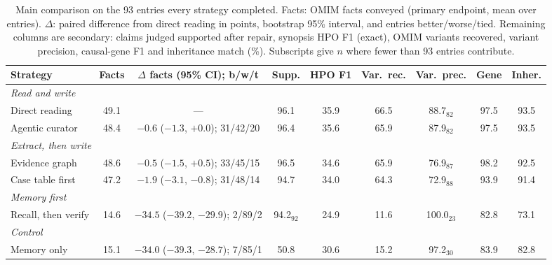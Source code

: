 \documentclass{article} %
\begin{document}
\begin{table}[t]
\caption{Main comparison on the 93 entries every strategy completed. Facts: OMIM facts conveyed (primary endpoint, mean over entries). $\Delta$: paired difference from direct reading in points, bootstrap 95\% interval, and entries better/worse/tied. Remaining columns are secondary: claims judged supported after repair, synopsis HPO F1 (exact), OMIM variants recovered, variant precision, causal-gene F1 and inheritance match (\%). Subscripts give $n$ where fewer than 93 entries contribute.}
\label{tab:main}
\begin{center}
\footnotesize
\setlength{\tabcolsep}{2.2pt}
\begin{tabular}{lcccccccc}
\toprule
Strategy & Facts & $\Delta$ facts (95\% CI); b/w/t & Supp. & HPO F1 & Var.\ rec. & Var.\ prec. & Gene & Inher. \\
\midrule
\multicolumn{9}{l}{\emph{Read and write}} \\
Direct reading & 49.1 & --- & 96.1 & 35.9 & 66.5 & 88.7$_{82}$ & 97.5 & 93.5 \\
Agentic curator & 48.4 & $-0.6$ ($-1.3$, $+0.0$); 31/42/20 & 96.4 & 35.6 & 65.9 & 87.9$_{82}$ & 97.5 & 93.5 \\
\multicolumn{9}{l}{\emph{Extract, then write}} \\
Evidence graph & 48.6 & $-0.5$ ($-1.5$, $+0.5$); 33/45/15 & 96.5 & 34.6 & 65.9 & 76.9$_{87}$ & 98.2 & 92.5 \\
Case table first & 47.2 & $-1.9$ ($-3.1$, $-0.8$); 31/48/14 & 94.7 & 34.0 & 64.3 & 72.9$_{88}$ & 93.9 & 91.4 \\
\multicolumn{9}{l}{\emph{Memory first}} \\
Recall, then verify & 14.6 & $-34.5$ ($-39.2$, $-29.9$); 2/89/2 & 94.2$_{92}$ & 24.9 & 11.6 & 100.0$_{23}$ & 82.8 & 73.1 \\
\multicolumn{9}{l}{\emph{Control}} \\
Memory only & 15.1 & $-34.0$ ($-39.3$, $-28.7$); 7/85/1 & 50.8 & 30.6 & 15.2 & 97.2$_{30}$ & 83.9 & 82.8 \\
\bottomrule
\end{tabular}
\end{center}
\end{table}
\end{document}

